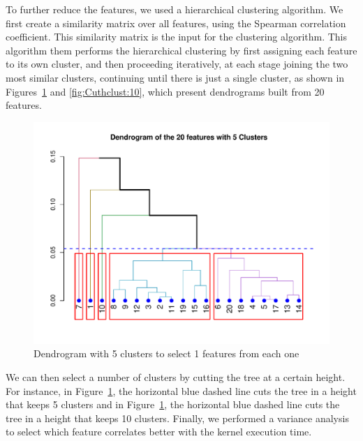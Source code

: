 To further reduce the features, we used a hierarchical clustering algorithm. We first create a similarity matrix over all features, using the Spearman correlation coefficient. This similarity matrix is the input for the clustering algorithm. This algorithm them performs the hierarchical clustering by first assigning each feature to its own cluster, and then proceeding iteratively, at each stage joining the two most similar clusters, continuing until there is just a single cluster, as shown in Figures~\ref{fig:Cuthclust:5} and \ref{fig:Cuthclust:10}, which present dendrograms built from 20 features. 

\begin{figure}[htbp]
    \centering
    \includegraphics[scale=.75]{./images/cluster-5.pdf}
    \caption{Dendrogram with 5 clusters to select 1 features from each one}
    \label{fig:Cuthclust:5}
\end{figure}

We can then select a number of clusters by cutting the tree at a certain height. For instance, in Figure~\ref{fig:Cuthclust:5}, the horizontal blue dashed line cuts the tree in a height that keeps 5 clusters and in Figure~\ref{fig:Cuthclust:5}, the horizontal blue dashed line cuts the tree in a height that keeps 10 clusters. Finally, we performed a variance analysis to select which feature correlates better with the kernel execution time. 

